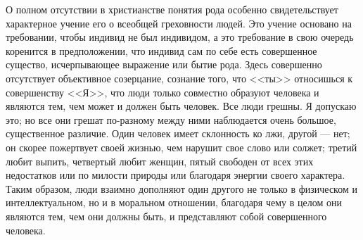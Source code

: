 \documentclass[12pt,oneside]{book}
\begin{document}
О полном отсутствии в христианстве понятия рода особенно свидетельствует характерное учение его о всеобщей греховности людей. Это учение основано на требовании, чтобы индивид не был индивидом, а это требование в свою очередь коренится в предположении, что индивид сам по себе есть совершенное существо, исчерпывающее выражение или бытие рода. Здесь совершенно отсутствует объективное созерцание, сознание того, что <<ты>> относишься к совершенству <<Я>>, что люди только совместно образуют человека и являются тем, чем может и должен быть человек. Все люди грешны. Я допускаю это; но все они грешат по-разному между ними наблюдается очень большое, существенное различие. Один человек имеет склонность ко лжи\dag\let\svthefootnote\thefootnote\let\thefootnote\relax{}\let\thefootnote\svthefootnote, другой --- нет; он скорее пожертвует своей жизнью, чем нарушит свое слово или солжет; третий любит выпить, четвертый любит женщин, пятый свободен от всех этих недостатков или по милости природы или благодаря энергии своего характера. Таким образом, люди взаимно дополняют один другого не только в физическом и интеллектуальном, но и в моральном отношении, благодаря чему в целом они являются тем, чем они должны быть, и представляют собой совершенного человека.
\end{document}
